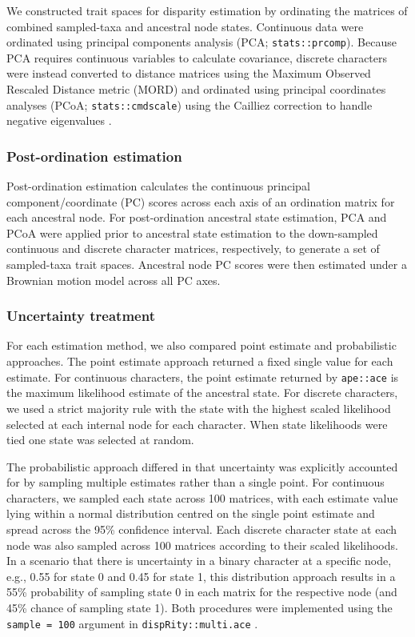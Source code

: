 \documentclass[11pt, a4paper]{article}
\begin{document}
We constructed trait spaces for disparity estimation by ordinating the matrices of combined sampled-taxa and ancestral node states.
Continuous data were ordinated using principal components analysis (PCA; \texttt{stats::prcomp}). 
Because PCA requires continuous variables to calculate covariance, discrete characters were instead converted to distance matrices using the Maximum Observed Rescaled Distance metric (MORD) \citep{lloyd2016estimating} and ordinated using principal coordinates analyses (PCoA; \texttt{stats::cmdscale}) using the Cailliez correction to handle negative eigenvalues \citep{cailliez1983analytical}.

\subsubsection{Post-ordination estimation} \label{post-ord}
Post-ordination estimation calculates the continuous principal component/coordinate (PC) scores across each axis of an ordination matrix for each ancestral node.
For post-ordination ancestral state estimation, PCA and PCoA were applied prior to ancestral state estimation to the down-sampled continuous and discrete character matrices, respectively, to generate a set of sampled-taxa trait spaces.
Ancestral node PC scores were then estimated under a Brownian motion model across all PC axes.

\subsubsection{Uncertainty treatment} \label{uncertainty}
For each estimation method, we also compared point estimate and probabilistic approaches.
The point estimate approach returned a fixed single value for each estimate.
For continuous characters, the point estimate returned by \texttt{ape::ace} is the maximum likelihood estimate of the ancestral state.
For discrete characters, we used a strict majority rule with the state with the highest scaled likelihood selected at each internal node for each character.
When state likelihoods were tied one state was selected at random.

The probabilistic approach differed in that uncertainty was explicitly accounted for by sampling multiple estimates rather than a single point.
For continuous characters, we sampled each state across 100 matrices, with each estimate value lying within a normal distribution centred on the single point estimate and spread across the 95\% confidence interval.
Each discrete character state at each node was also sampled across 100 matrices according to their scaled likelihoods.
In a scenario that there is uncertainty in a binary character at a specific node, e.g., 0.55 for state 0 and 0.45 for state 1, this distribution approach results in a 55\% probability of sampling state 0 in each matrix for the respective node (and 45\% chance of sampling state 1).
Both procedures were implemented using the \texttt{sample = 100} argument in \texttt{dispRity::multi.ace} \citep{guillerme2018disprity}.
\end{document}
